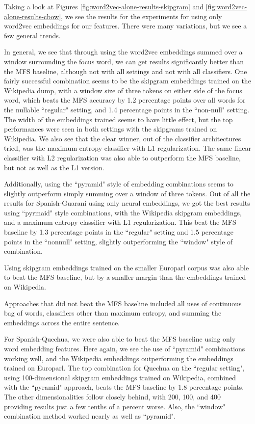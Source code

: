 Taking a look at Figures \ref{fig:word2vec-alone-results-skipgram} and
\ref{fig:word2vec-alone-results-cbow}, we see the results for the experiments
for using only word2vec embeddings for our features. There were many
variations, but we see a few general trends.


In general, we see that through using the word2vec embeddings summed over a
window surrounding the focus word, we can get results significantly better than
the MFS baseline, although not with all settings and not with all classifiers.
One fairly successful combination seems to be the skipgram embeddings trained
on the Wikipedia dump, with a window size of three tokens on either side of the
focus word, which beats the MFS accuracy by 1.2 percentage points over all
words for the nullable ``regular" setting, and 1.4 percentage points in the
``non-null" setting. The width of the embeddings trained seems to have little
effect, but the top performances were seen in both settings with the skipgrams
trained on Wikipedia. We also see that the clear winner, out of the classifier
architectures tried, was the maximum entropy classifier with L1 regularization.
The same linear classifier with L2 regularization was also able to outperform
the MFS baseline, but not as well as the L1 version.

Additionally, using the ``pyramid" style of embedding combinations seems to
slightly outperform simply summing over a window of three tokens. Out of all
the results for Spanish-Guaraní using only neural embeddings, we got the best
results using ``pyrmaid" style combinations, with the Wikipedia skipgram
embeddings, and a maximum entropy classifier with L1 regularization. This beat
the MFS baseline by 1.3 percentage points in the ``regular" setting and 1.5
percentage points in the ``nonnull" setting, slightly outperforming the
``window" style of combination.

Using skipgram embeddings trained on the smaller Europarl corpus was also able
to beat the MFS baseline, but by a smaller margin than the embeddings trained
on Wikipedia.

Approaches that did not beat the MFS baseline included all uses of continuous
bag of words, classifiers other than maximum entropy, and summing the
embeddings across the entire sentence.

For Spanish-Quechua, we were also able to beat the MFS baseline using only word
embedding features. Here again, we see the use of ``pyramid" combinations
working well, and the Wikipedia embeddings outperforming the embeddings trained
on Europarl. The top combination for Quechua on the ``regular setting", using
100-dimensional skipgram embeddings trained on Wikipedia, combined with the
``pyramid" approach, beats the MFS baseline by 1.8 percentage points. The other
dimensionalities follow closely behind, with 200, 100, and 400 providing
results just a few tenths of a percent worse. Also, the ``window" combination
method worked nearly as well as ``pyramid".

